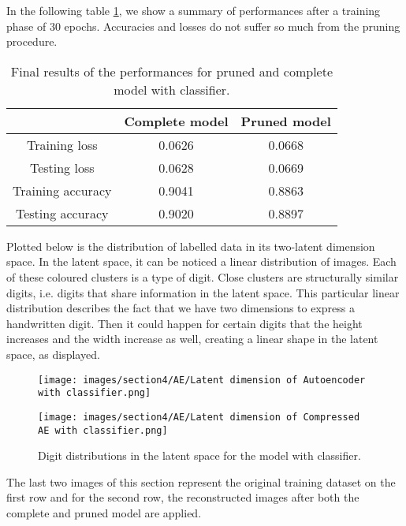 \documentclass{article}
\begin{document}
In the following table \ref{tab:results}, we show a summary of performances after a training phase of 30 epochs.
Accuracies and losses do not suffer so much from the pruning procedure.

\begin{table} [H]
  \centering
  \begin{tabular}{| c | c | c |}
  \hline
   & Complete model  &   Pruned model  \\
  \hline 
  \hline
  Training loss & 0.0626 & 0.0668 \\
  \hline
  Testing loss & 0.0628 & 0.0669 \\ 
  \hline
  Training accuracy & 0.9041 & 0.8863 \\ 
  \hline
  Testing accuracy & 0.9020 & 0.8897 \\
  \hline
  \end{tabular}
  \caption{Final results of the performances for pruned and complete model with classifier.}
  \label{tab:results}
\end{table}

Plotted below is the distribution of labelled data in its two-latent dimension space.
In the latent space, it can be noticed a linear distribution of images. 
Each of these coloured clusters is a type of digit. 
Close clusters are structurally similar digits, i.e. digits that share information in the latent space. 
This particular linear distribution describes the fact that we have two dimensions to express a handwritten digit. 
Then it could happen for certain digits that the height increases and the width increase as well, creating a linear shape in the latent space, as displayed. 

\begin{figure}[H]
  \centering
  \begin{minipage}[c]{.4\textwidth}
   {\texttt{[image: images/section4/AE/Latent dimension of Autoencoder with classifier.png]}}
    \end{minipage}
    \qquad \qquad
      \begin{minipage}[c]{0.4\textwidth}
  {\texttt{[image: images/section4/AE/Latent dimension of Compressed AE with classifier.png]}}
     \end{minipage}
     \quad   
   \caption{Digit distributions in the latent space for the model with classifier.}
    \label{fig:latent}
\end{figure}

The last two images of this section represent the original training dataset on the first row and 
for the second row, the reconstructed images after both the complete and pruned model are applied.
\end{document}
